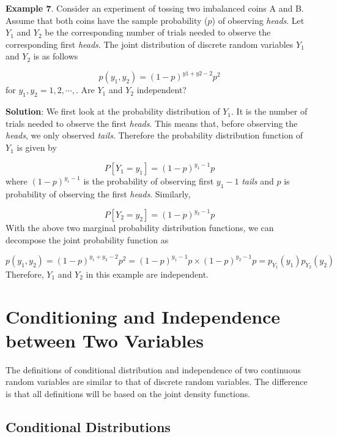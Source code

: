 \documentclass[
]{book}
\begin{document}
\hfill\break

\textbf{Example 7}. Consider an experiment of tossing two imbalanced coins A and B. Assume that both coins have the sample probability (\(p\)) of observing \emph{heads}. Let \(Y_1\) and \(Y_2\) be the corresponding number of trials needed to observe the corresponding first \emph{heads}. The joint distribution of discrete random variables \(Y_1\) and \(Y_2\) is as follows

\[
p( y_1, y_2) = (1-p)^{y1 + y2 - 2} p^2    
\]
for \(y_1, y_2 = 1, 2, \cdots,\). Are \(Y_1\) and \(Y_2\) independent?

\textbf{Solution}: We first look at the probability distribution of \(Y_1\). It is the number of trials needed to observe the first \emph{heads}. This means that, before observing the \emph{heads}, we only observed \emph{tails}. Therefore the probability distribution function of \(Y_1\) is given by

\[
 P[Y_1 = y_1] = (1-p)^{y_1-1}p
 \]
where \((1-p)^{y_1-1}\) is the probability of observing first \(y_1-1\) \emph{tails} and \(p\) is probability of observing the first \emph{heads}. Similarly,

\[
P[Y_2=y_2] = (1-p)^{y_2-1}p
\]
With the above two marginal probability distribution functions, we can decompose the joint probability function as

\[
p(y_1, y_2) = (1-p)^{y_1+y_2-2}p^2 = (1-p)^{y_1-1}p \times (1-p)^{y_2-1}p = p_{Y_1}(y_1) p_{Y_2}(y_2)
\]
Therefore, \(Y_1\) and \(Y_2\) in this example are independent.

\hfill\break

\hypertarget{conditioning-and-independence-between-two-variables}{%
\section{Conditioning and Independence between Two Variables}\label{conditioning-and-independence-between-two-variables}}

The definitions of conditional distribution and independence of two continuous random variables are similar to that of discrete random variables. The difference is that all definitions will be based on the joint density functions.

\hypertarget{conditional-distributions}{%
\subsection{Conditional Distributions}\label{conditional-distributions}}
\end{document}
